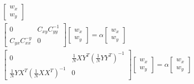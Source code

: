 \begin{gather*}
 \begin{bmatrix}
w_x \\
w_y 
\end{bmatrix} \\
 \begin{bmatrix}
0 & C_{xy} C_{yy}^{-1} \\
C_{yx} C_{xx}^{-y} & 0 
\end{bmatrix}
 \begin{bmatrix}
w_x \\
w_y 
\end{bmatrix}
= \alpha
 \begin{bmatrix}
w_x \\
w_y 
\end{bmatrix} \\
 \begin{bmatrix}
0 & \frac{1}{N} XY^{T} (\frac{1}{N} YY^{T})^{-1} \\
\frac{1}{N} YX^{T} (\frac{1}{N} XX^{T})^{-1} & 0 
\end{bmatrix}
 \begin{bmatrix}
w_x \\
w_y 
\end{bmatrix}
= \alpha
 \begin{bmatrix}
w_x \\
w_y 
\end{bmatrix}
\end{gather*}